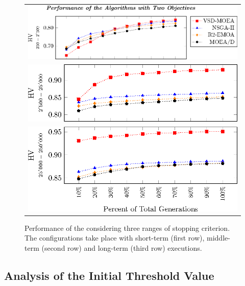 \begin{figure}[t]
\centering
%
\begin{tabular}{l}
 \includegraphics[scale=0.6]{Images/Time_tikz-figure0.eps}\\[0cm]%
 \includegraphics[scale=0.6]{Images/Time_tikz-figure1.eps}\\[0cm]%
 \includegraphics[scale=0.6]{Images/Time_tikz-figure2.eps}
\end{tabular}
\caption{Performance of the \MOEAS{} considering three ranges of stopping criterion. The configurations take place with short-term (first row), middle-term (second row) and long-term (third row) executions.}\label{fig:Performance_time_2obj}
\end{figure}



\subsection{Analysis of the Initial Threshold Value}

